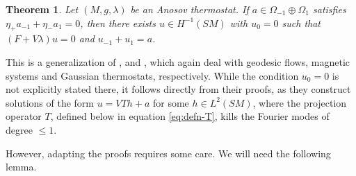 \documentclass[reqno,12pt,letterpaper]{amsart}
\newtheorem{theorem}[proposition]{Theorem}
\theoremstyle{definition}
\theoremstyle{remark}
\theoremstyle{definition}
\numberwithin{equation}{section}
\begin{document}
\begin{theorem}\label{theorem:extension-forms}
Let $(M, g, \lambda)$ be an Anosov thermostat. If $a\in \Omega_{-1}\oplus \Omega_1$ satisfies $\eta_+ a_{-1}+\eta_- a_1 = 0$, then there exists $u\in H^{-1}(SM)$ with $u_0=0$ such that $(F+V\lambda)u=0$ and $u_{-1}+u_1 = a$. 
\end{theorem}

This is a generalization of \cite[Theorem 1.5]{paternain14}, \cite[Theorem 1.7]{ainsworth15} and \cite[Theorem 1.8]{assylbekov17}, which again deal with geodesic flows, magnetic systems and Gaussian thermostats, respectively. While the condition $u_0=0$ is not explicitly stated there, it follows directly from their proofs, as they construct solutions of the form $u=VTh+a$ for some $h\in L^2(SM)$, where the projection operator $T$, defined below in equation \eqref{eq:defn-T}, kills the Fourier modes of degree $\leq 1$. 

However, adapting the proofs requires some care. We will need the following lemma.
\end{document}

